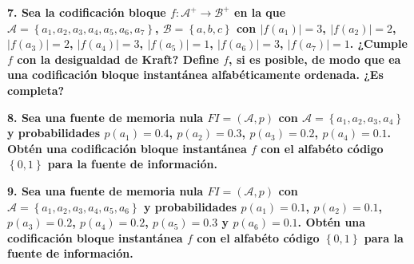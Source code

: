 \documentclass{article}
\begin{document}
\vspace{1cm}

\textbf{
7. Sea la codificación bloque $f:\mathcal{A}^+\rightarrow\mathcal{B}^+$ en la que $\mathcal{A}=\left\{a_1,a_2,a_3,a_4,a_5,a_6,a_7\right\}$, $\mathcal{B}=\left\{a,b,c\right\}$ con $\left|f(a_1)\right|=3$, $\left|f(a_2)\right|=2$, $\left|f(a_3)\right|=2$, $\left|f(a_4)\right|=3$, $\left|f(a_5)\right|=1$, $\left|f(a_6)\right|=3$, $\left|f(a_7)\right|=1$. ¿Cumple $f$ con la desigualdad de Kraft? Define $f$, si es posible, de modo que ea una codificación bloque instantánea alfabéticamente ordenada. ¿Es completa?
}

\vspace{1cm}

\textbf{
8. Sea una fuente de memoria nula $FI=\left(\mathcal{A},p\right)$ con $\mathcal{A}=\left\{a_1,a_2,a_3,a_4\right\}$ y probabilidades $p(a_1)=0.4$, $p(a_2)=0.3$, $p(a_3)=0.2$, $p(a_4)=0.1$. Obtén una codificación bloque instantánea $f$ con el alfabéto código $\left\{0,1\right\}$ para la fuente de información.
}

\vspace{1cm}

\textbf{
9. Sea una fuente de memoria nula $FI=\left(\mathcal{A},p\right)$ con $\mathcal{A}=\left\{a_1,a_2,a_3,a_4,a_5,a_6\right\}$ y probabilidades $p(a_1)=0.1$, $p(a_2)=0.1$, $p(a_3)=0.2$, $p(a_4)=0.2$, $p(a_5)=0.3$ y $p(a_6)=0.1$. Obtén una codificación bloque instantánea $f$ con el alfabéto código $\left\{0,1\right\}$ para la fuente de información.
}
\end{document}
